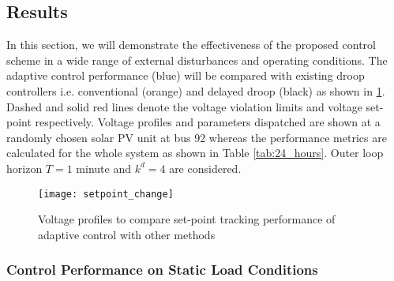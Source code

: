 \documentclass[journal]{IEEEtran}
\begin{document}
\subsection{Results}
In this section, we will demonstrate the effectiveness of the proposed control scheme in a wide range of external disturbances and operating conditions. The adaptive control performance (blue) will be compared with existing droop controllers i.e. conventional (orange) and delayed droop (black) as shown in \figurename\ref{fig:setpoint_change}. Dashed and solid red lines denote the voltage violation limits and voltage set-point respectively. Voltage profiles and parameters dispatched are shown at a randomly chosen solar PV unit at bus 92 whereas the performance metrics are calculated for the whole system as shown in Table \ref{tab:24_hours}. Outer loop horizon $T\!=\!1$ minute and $k^d\!=\!4$ are considered.
\begin{figure}
	\centering
	\texttt{[image: setpoint\_change]}
    \vspace{-0.5em}
    \caption {Voltage profiles to compare set-point tracking performance of adaptive control with other methods}%
    \label{fig:setpoint_change}
\end{figure}
\subsubsection{Control Performance on Static Load Conditions}
\end{document}
